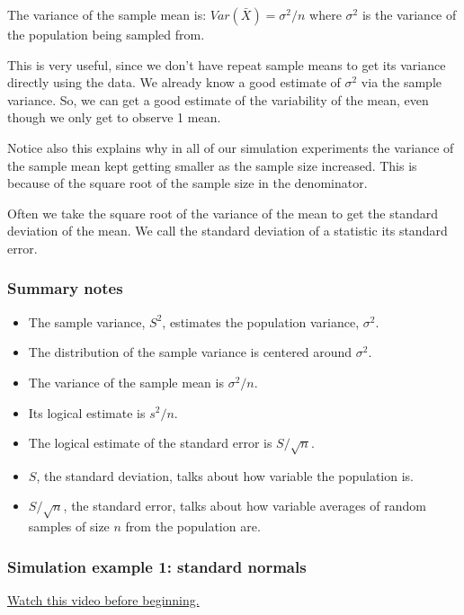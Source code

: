\documentclass[]{article}
\begin{document}
The variance of the sample mean is: $Var(\bar X) = \sigma^2 / n$ where
$\sigma^2$ is the variance of the population being sampled from.

This is very useful, since we don't have repeat sample means to get its
variance directly using the data. We already know a good estimate of
$\sigma^2$ via the sample variance. So, we can get a good estimate of
the variability of the mean, even though we only get to observe 1 mean.

Notice also this explains why in all of our simulation experiments the
variance of the sample mean kept getting smaller as the sample size
increased. This is because of the square root of the sample size in the
denominator.

Often we take the square root of the variance of the mean to get the
standard deviation of the mean. We call the standard deviation of a
statistic its standard error.

\subsubsection{Summary notes}\label{summary-notes-2}

\begin{itemize}
\itemsep1pt\parskip0pt
\item
  The sample variance, $S^2$, estimates the population variance,
  $\sigma^2$.
\item
  The distribution of the sample variance is centered around $\sigma^2$.
\item
  The variance of the sample mean is $\sigma^2 / n$.
\item
  Its logical estimate is $s^2 / n$.
\item
  The logical estimate of the standard error is $S / \sqrt{n}$.
\item
  $S$, the standard deviation, talks about how variable the population
  is.
\item
  $S/\sqrt{n}$, the standard error, talks about how variable averages of
  random samples of size $n$ from the population are.
\end{itemize}

\subsubsection{Simulation example 1: standard
normals}\label{simulation-example-1-standard-normals}

\href{http://youtu.be/uPjHB9JjGKI?list=PLpl-gQkQivXiBmGyzLrUjzsblmQsLtkzJ}{Watch
this video before beginning.}
\end{document}
